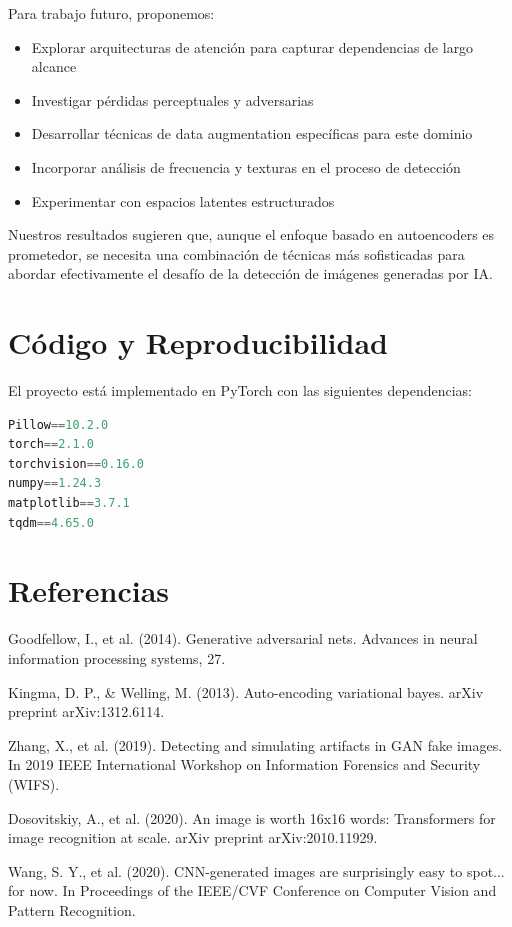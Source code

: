 \documentclass[conference]{IEEEtran}
\begin{document}
Para trabajo futuro, proponemos:

\begin{itemize}
    \item Explorar arquitecturas de atención para capturar dependencias de largo alcance
    \item Investigar pérdidas perceptuales y adversarias
    \item Desarrollar técnicas de data augmentation específicas para este dominio
    \item Incorporar análisis de frecuencia y texturas en el proceso de detección
    \item Experimentar con espacios latentes estructurados
\end{itemize}

Nuestros resultados sugieren que, aunque el enfoque basado en autoencoders es prometedor, se necesita una combinación de técnicas más sofisticadas para abordar efectivamente el desafío de la detección de imágenes generadas por IA.

\section{Código y Reproducibilidad}
El proyecto está implementado en PyTorch con las siguientes dependencias:

\begin{lstlisting}[language=Python]
Pillow==10.2.0
torch==2.1.0
torchvision==0.16.0
numpy==1.24.3
matplotlib==3.7.1
tqdm==4.65.0
\end{lstlisting}

\section{Referencias}
\begin{thebibliography}{9}
Goodfellow, I., et al. (2014). Generative adversarial nets. Advances in neural information processing systems, 27.

Kingma, D. P., & Welling, M. (2013). Auto-encoding variational bayes. arXiv preprint arXiv:1312.6114.

Zhang, X., et al. (2019). Detecting and simulating artifacts in GAN fake images. In 2019 IEEE International Workshop on Information Forensics and Security (WIFS).

Dosovitskiy, A., et al. (2020). An image is worth 16x16 words: Transformers for image recognition at scale. arXiv preprint arXiv:2010.11929.

Wang, S. Y., et al. (2020). CNN-generated images are surprisingly easy to spot... for now. In Proceedings of the IEEE/CVF Conference on Computer Vision and Pattern Recognition.
\end{thebibliography}
\end{document}
